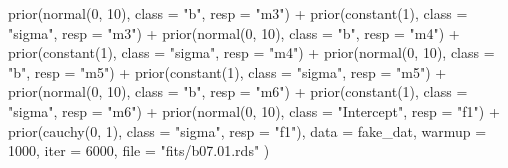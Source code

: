 \documentclass[
  letterpaper,
  DIV=11,
  numbers=noendperiod]{scrreprt}
\newenvironment{Shaded}{\begin{snugshade}}{\end{snugshade}}
\newcommand{\AttributeTok}[1]{\textcolor[rgb]{0.40,0.45,0.13}{#1}}
\newcommand{\DecValTok}[1]{\textcolor[rgb]{0.68,0.00,0.00}{#1}}
\newcommand{\FunctionTok}[1]{\textcolor[rgb]{0.28,0.35,0.67}{#1}}
\newcommand{\NormalTok}[1]{\textcolor[rgb]{0.00,0.23,0.31}{#1}}
\newcommand{\SpecialCharTok}[1]{\textcolor[rgb]{0.37,0.37,0.37}{#1}}
\newcommand{\StringTok}[1]{\textcolor[rgb]{0.13,0.47,0.30}{#1}}
\begin{document}
\begin{Shaded}
\begin{Highlighting}[]
      \FunctionTok{prior}\NormalTok{(}\FunctionTok{normal}\NormalTok{(}\DecValTok{0}\NormalTok{, }\DecValTok{10}\NormalTok{), }\AttributeTok{class =} \StringTok{"b"}\NormalTok{, }\AttributeTok{resp =} \StringTok{"m3"}\NormalTok{) }\SpecialCharTok{+}
      \FunctionTok{prior}\NormalTok{(}\FunctionTok{constant}\NormalTok{(}\DecValTok{1}\NormalTok{), }\AttributeTok{class =} \StringTok{"sigma"}\NormalTok{, }\AttributeTok{resp =} \StringTok{"m3"}\NormalTok{) }\SpecialCharTok{+}
      \FunctionTok{prior}\NormalTok{(}\FunctionTok{normal}\NormalTok{(}\DecValTok{0}\NormalTok{, }\DecValTok{10}\NormalTok{), }\AttributeTok{class =} \StringTok{"b"}\NormalTok{, }\AttributeTok{resp =} \StringTok{"m4"}\NormalTok{) }\SpecialCharTok{+}
      \FunctionTok{prior}\NormalTok{(}\FunctionTok{constant}\NormalTok{(}\DecValTok{1}\NormalTok{), }\AttributeTok{class =} \StringTok{"sigma"}\NormalTok{, }\AttributeTok{resp =} \StringTok{"m4"}\NormalTok{) }\SpecialCharTok{+}
      \FunctionTok{prior}\NormalTok{(}\FunctionTok{normal}\NormalTok{(}\DecValTok{0}\NormalTok{, }\DecValTok{10}\NormalTok{), }\AttributeTok{class =} \StringTok{"b"}\NormalTok{, }\AttributeTok{resp =} \StringTok{"m5"}\NormalTok{) }\SpecialCharTok{+}
      \FunctionTok{prior}\NormalTok{(}\FunctionTok{constant}\NormalTok{(}\DecValTok{1}\NormalTok{), }\AttributeTok{class =} \StringTok{"sigma"}\NormalTok{, }\AttributeTok{resp =} \StringTok{"m5"}\NormalTok{) }\SpecialCharTok{+}
      \FunctionTok{prior}\NormalTok{(}\FunctionTok{normal}\NormalTok{(}\DecValTok{0}\NormalTok{, }\DecValTok{10}\NormalTok{), }\AttributeTok{class =} \StringTok{"b"}\NormalTok{, }\AttributeTok{resp =} \StringTok{"m6"}\NormalTok{) }\SpecialCharTok{+}
      \FunctionTok{prior}\NormalTok{(}\FunctionTok{constant}\NormalTok{(}\DecValTok{1}\NormalTok{), }\AttributeTok{class =} \StringTok{"sigma"}\NormalTok{, }\AttributeTok{resp =} \StringTok{"m6"}\NormalTok{) }\SpecialCharTok{+}
      \FunctionTok{prior}\NormalTok{(}\FunctionTok{normal}\NormalTok{(}\DecValTok{0}\NormalTok{, }\DecValTok{10}\NormalTok{), }\AttributeTok{class =} \StringTok{"Intercept"}\NormalTok{, }\AttributeTok{resp =} \StringTok{"f1"}\NormalTok{) }\SpecialCharTok{+}
      \FunctionTok{prior}\NormalTok{(}\FunctionTok{cauchy}\NormalTok{(}\DecValTok{0}\NormalTok{, }\DecValTok{1}\NormalTok{), }\AttributeTok{class =} \StringTok{"sigma"}\NormalTok{, }\AttributeTok{resp =} \StringTok{"f1"}\NormalTok{),}
    \AttributeTok{data =}\NormalTok{ fake\_dat,}
    \AttributeTok{warmup =} \DecValTok{1000}\NormalTok{,}
    \AttributeTok{iter =} \DecValTok{6000}\NormalTok{,}
    \AttributeTok{file =} \StringTok{"fits/b07.01.rds"}
\NormalTok{  )}
\end{Highlighting}
\end{Shaded}
\end{document}

